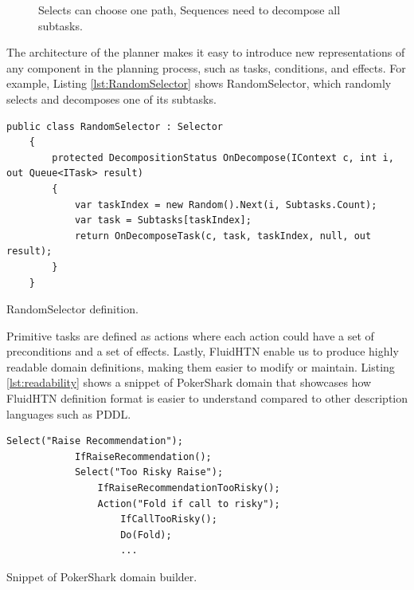 \begin{figure}[h]
    \centering
    \caption{Selects can choose one path, Sequences need to decompose all subtasks.}
    \label{fig:select_sequence}
\end{figure}

The architecture of the planner makes it easy to introduce new representations of any component in the planning process, such as tasks, conditions, and effects. For example, Listing \ref{lst:RandomSelector} shows RandomSelector, which randomly selects and decomposes one of its subtasks.

\begin{Listing}
    \begin{lstlisting}[language={[Sharp]C}]
    public class RandomSelector : Selector
    {
        protected DecompositionStatus OnDecompose(IContext c, int i, out Queue<ITask> result)
        {
            var taskIndex = new Random().Next(i, Subtasks.Count);
            var task = Subtasks[taskIndex];
            return OnDecomposeTask(c, task, taskIndex, null, out result);
        }
    }
    \end{lstlisting}
    \caption{RandomSelector definition.}
    \label{lst:RandomSelector}
\end{Listing}

Primitive tasks are defined as actions where each action could have a set of preconditions and a set of effects. Lastly, FluidHTN enable us to produce highly readable domain definitions, making them easier to modify or maintain. Listing \ref{lst:readability} shows a snippet of PokerShark domain that showcases how FluidHTN definition format is easier to understand compared to other description languages such as PDDL.


\begin{Listing}
    \begin{lstlisting}[language={[Sharp]C}]
        Select("Raise Recommendation");    
            IfRaiseRecommendation();
            Select("Too Risky Raise");
                IfRaiseRecommendationTooRisky();
                Action("Fold if call to risky");
                    IfCallTooRisky();
                    Do(Fold);
                    ...
    \end{lstlisting}
    \caption{Snippet of PokerShark domain builder.}
    \label{lst:readability}
\end{Listing}